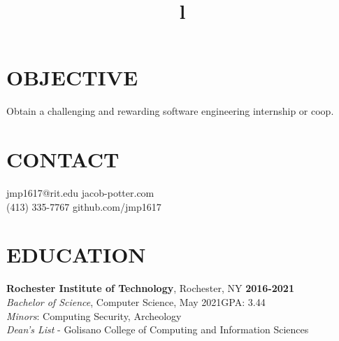 \documentclass[line,margin]{res}
\begin{document}
\begin{resume}

\section{OBJECTIVE}
Obtain a challenging and rewarding software engineering internship or coop.

\section{CONTACT}
{jmp1617@rit.edu}\hfill 
{jacob-potter.com}\\
(413) 335-7767\hfill 
{github.com/jmp1617}

\section{EDUCATION}
\textbf{Rochester Institute of Technology}, Rochester, NY\hfill
    \textbf{2016-2021}\\
{\sl Bachelor of Science}, Computer Science, May 2021\hfill GPA: 3.44
\\
{\sl Minors}: Computing Security, Archeology
\\
{\sl Dean's List} - Golisano College of Computing and Information Sciences

\begin{format}
\title{l}\\
\\
\body\\
\end{format}

\end{resume}
\end{document}
